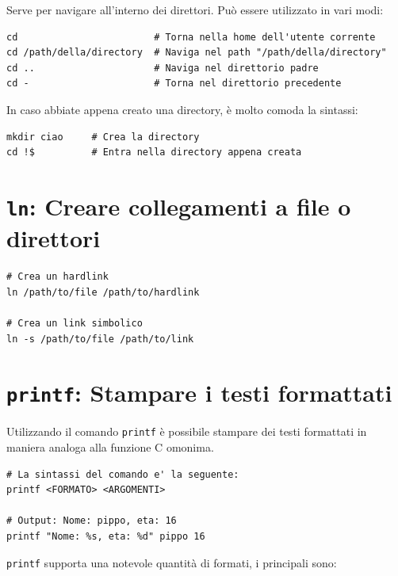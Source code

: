 \documentclass[a4paper]{report}
\newenvironment{info}{\begin{tcolorbox}[fonttitle=\sffamily\bfseries\large,title=Info,colframe=blue!75!white]}{\end{tcolorbox}}
\newenvironment{code}{\begin{tcolorbox}[size=small]}{\end{tcolorbox}}
\begin{document}
Serve per navigare all'interno dei direttori. Può essere utilizzato in vari modi:

\begin{code}
\begin{lstlisting}
cd                        # Torna nella home dell'utente corrente
cd /path/della/directory  # Naviga nel path "/path/della/directory"
cd ..                     # Naviga nel direttorio padre
cd -                      # Torna nel direttorio precedente
\end{lstlisting}
\end{code}

\begin{info}
In caso abbiate appena creato una directory, è molto comoda la sintassi:
\begin{lstlisting}
mkdir ciao     # Crea la directory
cd !$          # Entra nella directory appena creata
\end{lstlisting}
\end{info}

\section{\texttt{ln}: Creare collegamenti a file o direttori}

\begin{code}
\begin{lstlisting}
# Crea un hardlink
ln /path/to/file /path/to/hardlink

# Crea un link simbolico
ln -s /path/to/file /path/to/link
\end{lstlisting}
\end{code}

\section{\texttt{printf}: Stampare i testi formattati}

Utilizzando il comando \texttt{printf} è possibile stampare dei testi formattati in maniera analoga alla funzione C omonima.

\begin{code}
\begin{lstlisting}
# La sintassi del comando e' la seguente:
printf <FORMATO> <ARGOMENTI>

# Output: Nome: pippo, eta: 16
printf "Nome: %s, eta: %d" pippo 16
\end{lstlisting}
\end{code}

\texttt{printf} supporta una notevole quantità di formati, i principali sono:
\end{document}
